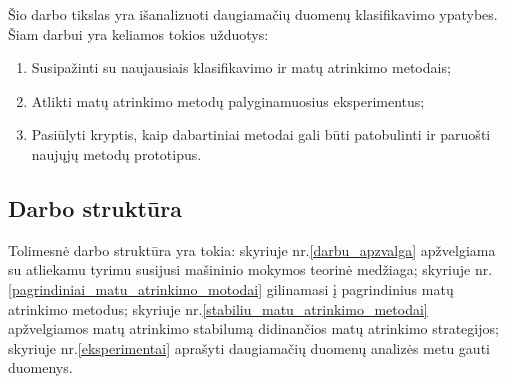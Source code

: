 Šio darbo tikslas yra išanalizuoti daugiamačių duomenų klasifikavimo ypatybes. Šiam darbui yra keliamos tokios užduotys:
\begin{enumerate}
 \item Susipažinti su naujausiais klasifikavimo ir matų atrinkimo metodais;
 \item Atlikti matų atrinkimo metodų palyginamuosius eksperimentus;
 \item Pasiūlyti kryptis, kaip dabartiniai metodai gali būti patobulinti ir paruošti naujųjų metodų prototipus.
\end{enumerate}

\subsection*{Darbo struktūra}

Tolimesnė darbo struktūra yra tokia: skyriuje nr.\ref{darbu_apzvalga} apžvelgiama su atliekamu tyrimu susijusi mašininio mokymos teorinė medžiaga; skyriuje nr.\ref{pagrindiniai_matu_atrinkimo_motodai} gilinamasi į pagrindinius matų atrinkimo metodus; skyriuje nr.\ref{stabiliu_matu_atrinkimo_metodai} apžvelgiamos matų atrinkimo stabilumą didinančios matų atrinkimo strategijos; skyriuje nr.\ref{eksperimentai} aprašyti daugiamačių duomenų analizės metu gauti duomenys.

